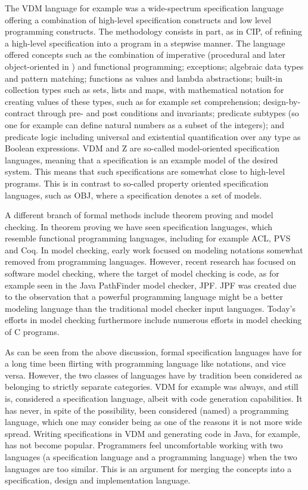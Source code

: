 The VDM language for example was a wide-spectrum specification 
language offering a combination of high-level specification 
constructs and low level programming constructs. The methodology 
consists in part, as in CIP, of refining a high-level specification 
into a program in a stepwise manner. The language offered concepts 
such as the combination of imperative (procedural and later 
object-oriented in \vdmpp) and functional programming; exceptions; 
algebraic data types and pattern matching; functions as values and 
lambda abstractions; built-in collection types such as sets, lists 
and maps, with mathematical notation for creating values of these 
types, such as for example set comprehension; design-by-contract 
through pre- and post conditions and invariants; predicate subtypes 
(so one for example can define natural numbers as a subset of the 
integers);  and predicate logic including universal and existential 
quantification over any type as Boolean expressions.  VDM and Z are 
so-called model-oriented specification languages, meaning that a 
specification is an example model of the desired system. This means 
that such specifications are somewhat close to high-level programs. 
This is in contrast to so-called property oriented specification 
languages, such as OBJ, where a specification denotes a set of models.  

A different branch of formal methods include theorem proving and 
model checking. In theorem proving we have seen specification 
languages, which resemble functional programming languages, 
including for example ACL, PVS and Coq. In model checking, early 
work focused on modeling notations somewhat removed from 
programming languages. However, recent research has focused on 
software model checking, where the target of model checking is 
code, as for example seen in the Java PathFinder model checker, 
JPF. JPF was created due to the observation that a powerful 
programming language might be a better modeling language than the 
traditional model checker input languages. Today’s 
efforts in model checking furthermore include numerous efforts in 
model checking of C programs.

As can be seen from the above discussion, formal specification 
languages have for a long time been flirting with programming 
language like notations, and vice versa. However, the two classes of languages have by tradition been considered as belonging to 
strictly separate categories. VDM for example was always, and still 
is, considered a specification language, albeit with code 
generation capabilities. It has never, in spite of the possibility, 
been considered (named) a programming language, which one may 
consider being as one of the reasons it is not more wide spread. 
Writing specifications in VDM and generating code in Java, for 
example, has not become popular. Programmers feel uncomfortable 
working with two languages (a specification language and  a 
programming language) when the two languages are too similar. This 
is an argument for merging the concepts into a  specification, 
design and implementation language.


